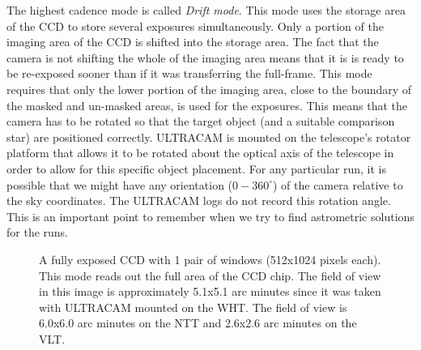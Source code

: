 The highest cadence mode is called \emph{Drift mode}. This mode uses the storage area of the CCD to store several exposures simultaneously. Only a portion of the imaging area of the CCD is shifted into the storage area. The fact that the camera is not shifting the whole of the imaging area means that it is is ready to be re-exposed sooner than if it was transferring the full-frame. This mode requires that only the lower portion of the imaging area, close to the boundary of the masked and un-masked areas, is used for the exposures. This means that the camera has to be rotated so that the target object (and a suitable comparison star) are positioned correctly. ULTRACAM is mounted on the telescope's rotator platform that allows it to be rotated about the optical axis of the telescope in order to allow for this specific object placement. For any particular run, it is possible that we might have any orientation ($0-360^{\circ}$) of the camera relative to the sky coordinates. The ULTRACAM logs do not record this rotation angle. This is an important point to remember when we try to find astrometric solutions for the runs.    

\begin{figure}
  \centering
  \setlength{\fboxsep}{0pt}
  \setlength{\fboxrule}{1pt}
  \caption{A fully exposed CCD with 1 pair of windows (512x1024 pixels each).  This mode reads out the full area of the CCD chip. The field of view in this image is approximately 5.1x5.1 arc minutes since it was taken with ULTRACAM mounted on the WHT. The field of view is 6.0x6.0 arc minutes on the NTT and 2.6x2.6 arc minutes on the VLT.}
  \label{fig:KOI-824}
\end{figure}

